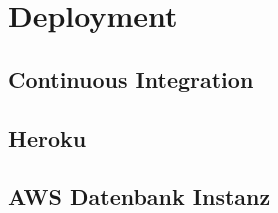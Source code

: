 \section{Deployment}
\subsection{Continuous Integration}
\subsection{Heroku}
\subsection{AWS Datenbank Instanz}
